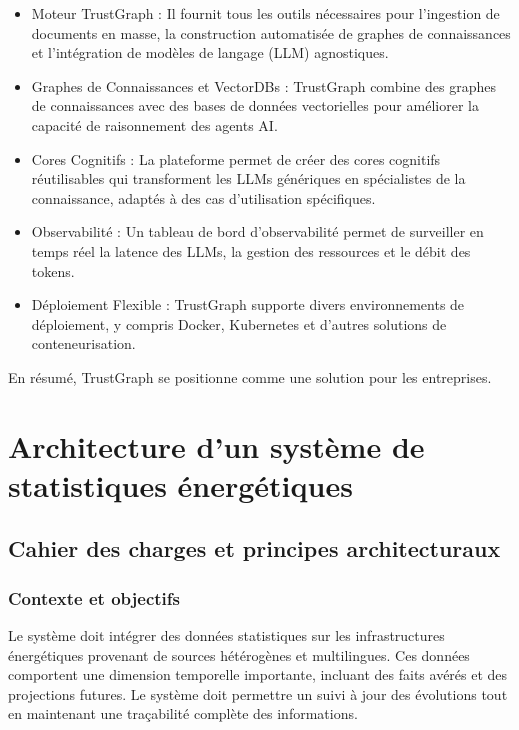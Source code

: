 \documentclass[a4paper,11pt]{report}
\providecommand{\tightlist}{\setlength{\itemsep}{0pt}\setlength{\parskip}{0pt}}
\begin{document}
\begin{itemize}
\tightlist
\item
  Moteur TrustGraph : Il fournit tous les outils nécessaires pour l'ingestion de documents en masse, la construction automatisée de graphes de connaissances et l'intégration de modèles de langage (LLM) agnostiques.
\item
  Graphes de Connaissances et VectorDBs : TrustGraph combine des graphes de connaissances avec des bases de données vectorielles pour améliorer la capacité de raisonnement des agents AI.
\item
  Cores Cognitifs : La plateforme permet de créer des cores cognitifs réutilisables qui transforment les LLMs génériques en spécialistes de la connaissance, adaptés à des cas d'utilisation spécifiques.
\item
  Observabilité : Un tableau de bord d'observabilité permet de surveiller en temps réel la latence des LLMs, la gestion des ressources et le débit des tokens.
\item
  Déploiement Flexible : TrustGraph supporte divers environnements de déploiement, y compris Docker, Kubernetes et d'autres solutions de conteneurisation.
\end{itemize}

En résumé, TrustGraph se positionne comme une solution pour les entreprises.

\chapter{Architecture d'un système de statistiques énergétiques}\label{architecture-dun-systuxe8me-de-statistiques-uxe9nerguxe9tiques}

\section{Cahier des charges et principes architecturaux}\label{cahier-des-charges-et-principes-architecturaux}

\subsection{Contexte et objectifs}\label{contexte-et-objectifs}

Le système doit intégrer des données statistiques sur les infrastructures énergétiques provenant de sources hétérogènes et multilingues. Ces données comportent une dimension temporelle importante, incluant des faits avérés et des projections futures. Le système doit permettre un suivi à jour des évolutions tout en maintenant une traçabilité complète des informations.
\end{document}
